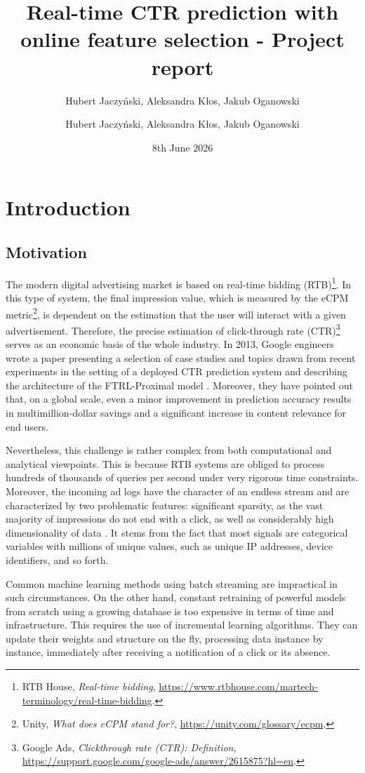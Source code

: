 \documentclass[12pt]{article}
\title{Real-time CTR prediction with online feature selection - Project report}
\author{Hubert Jaczyński, Aleksandra Kłos, Jakub Oganowski}
\author{Hubert Jaczy\'nski, Aleksandra K{\l}os, Jakub Oganowski}
\date{8th June 2026}
\begin{document}
\maketitle

\section{Introduction}

\subsection{Motivation}


The modern digital advertising market is based on real-time bidding (RTB)\footnote{RTB House, \textit{Real-time bidding}, \url{https://www.rtbhouse.com/martech-terminology/real-time-bidding}.}. In this type of system, the final impression value, which is measured by the eCPM metric\footnote{Unity, \textit{What does eCPM stand for?}, \url{https://unity.com/glossary/ecpm}.}, is dependent on the estimation that the user will interact with a given advertisement. Therefore, the precise estimation of click-through rate (CTR)\footnote{Google Ads, \textit{Clickthrough rate (CTR): Definition}, \url{https://support.google.com/google-ads/answer/2615875?hl=en}.} serves as an economic basis of the whole industry. In 2013, Google engineers wrote a paper presenting a selection of case studies and topics drawn from recent experiments in the setting of a deployed CTR prediction system and describing the architecture of the FTRL-Proximal model \cite{mcmahan2013ad}. Moreover, they have pointed out that, on a global scale, even a minor improvement in prediction accuracy results in multimillion-dollar savings and a significant increase in content relevance for end users.

Nevertheless, this challenge is rather complex from both computational and analytical viewpoints. This is because RTB systems are obliged to process hundreds of thousands of queries per second under very rigorous time constraints. Moreover, the incoming ad logs have the character of an endless stream and are characterized by two problematic features: significant sparsity, as the vast majority of impressions do not end with a click, as well as considerably high dimensionality of data \cite{domingos2000mining}. It stems from the fact that most signals are categorical variables with millions of unique values, such as unique IP addresses, device identifiers, and so forth. 

Common machine learning methods using batch streaming are impractical in such circumstances. On the other hand, constant retraining of powerful models from scratch using a growing database is too expensive in terms of time and infrastructure. This requires the use of incremental learning algorithms. They can update their weights and structure on the fly, processing data instance by instance, immediately after receiving a notification of a click or its absence.
\end{document}
